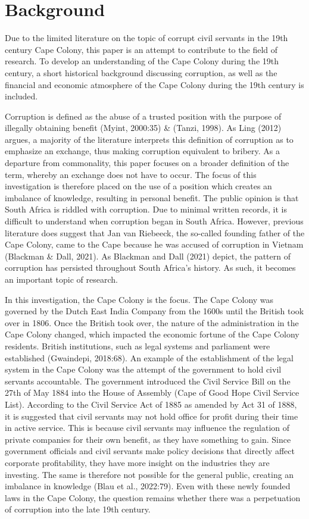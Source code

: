\documentclass[12pt,preprint, authoryear]{elsarticle}
\numberwithin{equation}{section}
\numberwithin{figure}{section}
\numberwithin{table}{section}
\begin{document}
\hypertarget{background}{%
\section{Background}\label{background}}

Due to the limited literature on the topic of corrupt civil servants in
the 19th century Cape Colony, this paper is an attempt to contribute to
the field of research. To develop an understanding of the Cape Colony
during the 19th century, a short historical background discussing
corruption, as well as the financial and economic atmosphere of the Cape
Colony during the 19th century is included.

Corruption is defined as the abuse of a trusted position with the
purpose of illegally obtaining benefit (Myint, 2000:35) \& (Tanzi,
1998). As Ling (2012) argues, a majority of the literature interprets
this definition of corruption as to emphasize an exchange, thus making
corruption equivalent to bribery. As a departure from commonality, this
paper focuses on a broader definition of the term, whereby an exchange
does not have to occur. The focus of this investigation is therefore
placed on the use of a position which creates an imbalance of knowledge,
resulting in personal benefit. The public opinion is that South Africa
is riddled with corruption. Due to minimal written records, it is
difficult to understand when corruption began in South Africa. However,
previous literature does suggest that Jan van Riebeeck, the so-called
founding father of the Cape Colony, came to the Cape because he was
accused of corruption in Vietnam (Blackman \& Dall, 2021). As Blackman
and Dall (2021) depict, the pattern of corruption has persisted
throughout South Africa's history. As such, it becomes an important
topic of research.

In this investigation, the Cape Colony is the focus. The Cape Colony was
governed by the Dutch East India Company from the 1600s until the
British took over in 1806. Once the British took over, the nature of the
administration in the Cape Colony changed, which impacted the economic
fortune of the Cape Colony residents. British institutions, such as
legal systems and parliament were established (Gwaindepi, 2018:68). An
example of the establishment of the legal system in the Cape Colony was
the attempt of the government to hold civil servants accountable. The
government introduced the Civil Service Bill on the 27th of May 1884
into the House of Assembly (Cape of Good Hope Civil Service List).
According to the Civil Service Act of 1885 as amended by Act 31 of 1888,
it is suggested that civil servants may not hold office for profit
during their time in active service. This is because civil servants may
influence the regulation of private companies for their own benefit, as
they have something to gain. Since government officials and civil
servants make policy decisions that directly affect corporate
profitability, they have more insight on the industries they are
investing. The same is therefore not possible for the general public,
creating an imbalance in knowledge (Blau et al., 2022:79). Even with
these newly founded laws in the Cape Colony, the question remains
whether there was a perpetuation of corruption into the late 19th
century.
\end{document}
